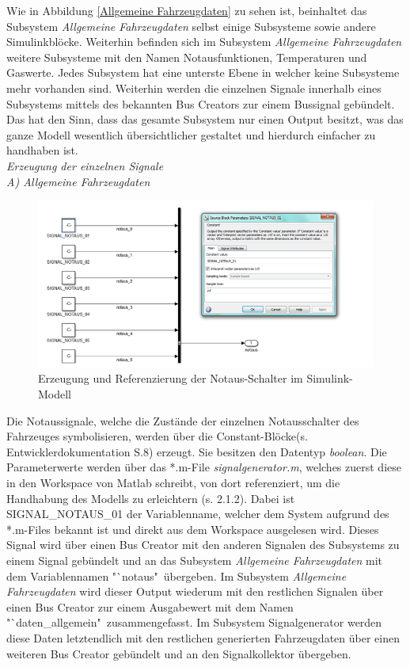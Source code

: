 \documentclass[fontsize = 12pt, paper = a4]{scrreprt}
\begin{document}
\newpage




Wie in Abbildung \ref{Allgemeine Fahrzeugdaten} zu sehen ist, beinhaltet das Subsystem \textit{Allgemeine Fahrzeugdaten} selbst einige Subsysteme sowie andere Simulinkblöcke. Weiterhin befinden sich im Subsystem \textit{Allgemeine Fahrzeugdaten} weitere Subsysteme mit den Namen Notausfunktionen, Temperaturen und Gaswerte. Jedes Subsystem hat eine unterste Ebene in welcher keine Subsysteme mehr vorhanden sind. Weiterhin werden die einzelnen Signale innerhalb eines Subsystems mittels des bekannten Bus Creators zur einem Bussignal gebündelt. Das hat den Sinn, dass das gesamte Subsystem nur einen Output besitzt, was das ganze Modell wesentlich übersichtlicher gestaltet und hierdurch einfacher zu handhaben ist. \\

\textit{Erzeugung der einzelnen Signale } \\

\textit{A) Allgemeine Fahrzeugdaten} \\

\begin{figure}[h]
\centering
\includegraphics[scale = 0.95]{notaus}
\caption[Testsignale der Notaus-Schalter]{Erzeugung und Referenzierung der Notaus-Schalter im Simulink-Modell}
\label{notaus}
\end{figure}

Die Notaussignale, welche die Zustände der einzelnen Notausschalter des Fahrzeuges symbolisieren, werden über die Constant-Blöcke(s. Entwicklerdokumentation S.8) erzeugt. Sie besitzen den Datentyp \textit{boolean}. Die Parameterwerte werden über das *.m-File \textit{signalgenerator.m},  welches zuerst diese in den Workspace von Matlab schreibt, von dort referenziert, um die Handhabung des Modells zu erleichtern (s. 2.1.2). Dabei ist SIGNAL\_NOTAUS\_01 der Variablenname, welcher dem System aufgrund des *.m-Files bekannt ist und  direkt aus dem Workspace  ausgelesen wird. Dieses Signal wird über einen Bus Creator mit den anderen Signalen des Subsystems zu einem Signal gebündelt und an das Subsystem \textit{Allgemeine Fahrzeugdaten} mit dem Variablennamen "`notaus"\ übergeben. Im Subsystem \textit{Allgemeine Fahrzeugdaten} wird dieser Output wiederum mit den restlichen Signalen über einen Bus Creator zur einem Ausgabewert mit dem Namen "`daten\_allgemein"\ zusammengefasst.  Im Subsystem Signalgenerator  werden diese Daten letztendlich mit den restlichen generierten Fahrzeugdaten über einen weiteren Bus Creator gebündelt und an den Signalkollektor übergeben. 
\end{document}
